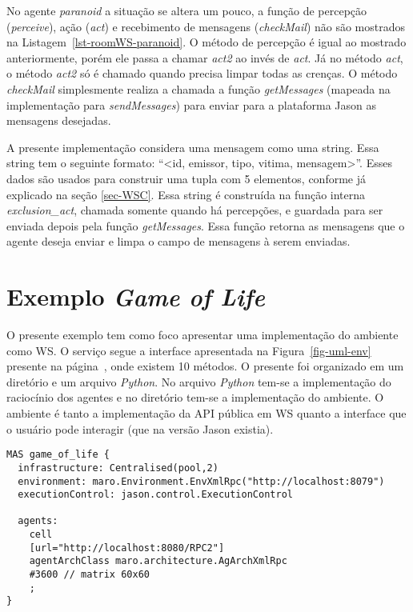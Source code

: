No agente \emph{paranoid} a situação se altera um pouco, a função de percepção
(\emph{perceive}), ação (\emph{act}) e recebimento de mensagens
(\emph{checkMail}) não são mostrados na Listagem~\ref{lst-roomWS-paranoid}.
O método de percepção é igual ao mostrado
anteriormente, porém ele passa a chamar \emph{act2} ao invés de \emph{act}.
Já no método \emph{act}, o método \emph{act2} só é chamado quando
precisa limpar todas as crenças. O método \emph{checkMail}
simplesmente realiza a chamada a função \emph{getMessages} (mapeada na
implementação para \emph{sendMessages}) para enviar para a plataforma Jason as
mensagens desejadas.

A presente implementação considera uma mensagem como uma string. Essa string
tem o seguinte formato: ``<id, emissor, tipo, vitima, mensagem>''. Esses dados
são usados para construir uma tupla com 5 elementos, conforme já explicado na
seção \ref{sec-WSC}. Essa string é construída na função interna
\emph{exclusion\_act}, chamada somente quando há percepções, e
guardada para ser enviada depois pela função \emph{getMessages}. Essa função
retorna as mensagens que o agente deseja enviar e limpa o campo de
mensagens à serem enviadas.


\section{Exemplo \emph{Game of Life}} \label{casoWS-gol}

O presente exemplo tem como foco apresentar uma implementação do
ambiente como WS. O serviço segue a interface apresentada na
Figura~\ref{fig-uml-env} presente na página~\pageref{fig-uml-env}, onde
existem 10 métodos.
%
O presente foi organizado em um diretório e um arquivo \emph{Python}. No arquivo
\emph{Python} tem-se a implementação do raciocínio dos agentes e no diretório
tem-se a implementação do ambiente. O ambiente é tanto a implementação da API
pública em WS quanto a interface que o usuário pode interagir (que na versão
Jason existia).

\lstset{linewidth=130mm}
\begin{center}
    \begin{minipage}{140mm}
	\begin{lstlisting}[frame=trbl, caption=Arquivo de projeto do \emph{Game-of-Life}., label=lst-gol]
MAS game_of_life {
  infrastructure: Centralised(pool,2)
  environment: maro.Environment.EnvXmlRpc("http://localhost:8079")
  executionControl: jason.control.ExecutionControl

  agents:
    cell
    [url="http://localhost:8080/RPC2"]
    agentArchClass maro.architecture.AgArchXmlRpc
    #3600 // matrix 60x60
    ;
}
	\end{lstlisting}
    \end{minipage}
\end{center}

